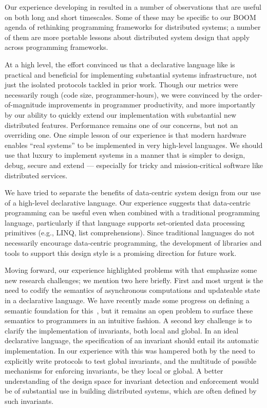 Our experience developing \BOOMA in \OVERLOG resulted in a number of observations
that are useful on both long and short timescales.  Some of these may be
specific to our BOOM agenda of rethinking programming frameworks for distributed
systems; a number of them are more portable lessons about distributed system
design that apply across programming frameworks.

At a high level, the effort convinced us that a declarative language like
\OVERLOG is practical and beneficial for implementing substantial systems
infrastructure, not just the isolated protocols tackled in prior work.  Though
our metrics were necessarily rough (code size, programmer-hours), we were
convinced by the order-of-magnitude improvements in programmer productivity, and 
more importantly by our ability to quickly extend our implementation with
substantial new distributed features.  Performance remains one of our concerns,
but not an overriding one.  One simple lesson of our experience is that modern
hardware enables ``real systems'' to be implemented in very high-level
languages.  We should use that luxury to implement systems in a manner that is
simpler to design, debug, secure and extend --- especially for tricky and 
mission-critical software like distributed services.

We have tried to separate the benefits of data-centric system design from our 
use of a high-level declarative language. Our experience suggests that
data-centric programming can be useful even when combined with a traditional
programming language, particularly if that language supports set-oriented data
processing primitives (e.g., LINQ, list comprehensions). Since traditional
languages do not necessarily encourage data-centric programming, the development
of libraries and tools to support this design style is a promising direction for 
future work.

Moving forward, our experience highlighted problems with \OVERLOG that emphasize some
new research challenges; we mention two here briefly.  First and most urgent is
the need to codify the semantics of asynchronous computations and updateable
state in a declarative language.  We have recently made some progress on
defining a semantic foundation for this~\cite{dedalus-tr}, but it remains an
open problem to surface these semantics to programmers in an intuitive fashion.
A second key challenge is to clarify the implementation of invariants, both
local and global.  In an ideal declarative language, the specification of an
invariant should entail its automatic implementation.  In our experience with
\OVERLOG this was hampered both by the need to explicitly write protocols to test
global invariants, and the multitude of possible mechanisms for enforcing
invariants, be they local or global.  A better understanding of the design space
for invariant detection and enforcement would be of substantial use in building
distributed systems, which are often defined by such invariants.


